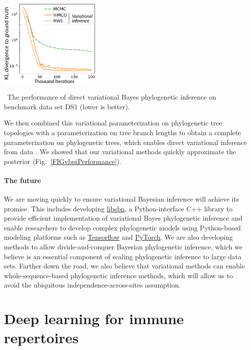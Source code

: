 \documentclass[nobib]{tufte-handout}
\begin{document}
\begin{marginfigure}[0.7in]%
  \includegraphics[width=1.95in]{vbpi-performance}
  \caption{\
    The performance of direct variational Bayes phylogenetic inference on benchmark data set DS1 (lower is better).
    }
  \label{FIGvbpiPerformance}
\end{marginfigure}%

We then combined this variational parameterization on phylogenetic tree topologies with a parameterization on tree branch lengths to obtain a complete parameterization on phylogenetic trees, which enables direct variational inference from data \cite{Zhang2018-lw}.
We showed that our variational methods quickly approximate the posterior (Fig.~\ref{FIGvbpiPerformance}).

\paragraph{The future}
We are moving quickly to ensure variational Bayesian inference will achieve its promise.
This includes developing \href{https://github.com/matsengrp/libsbn/}{libsbn}, a Python-interface C++ library to provide efficient implementation of variational Bayes phylogenetic inference and enable researchers to develop complex phylogenetic models using Python-based modeling platforms such as \href{https://www.tensorflow.org/}{Tensorflow} and \href{https://pytorch.org/}{PyTorch}.
We are also developing methods to allow divide-and-conquer Bayesian phylogenetic inference, which we believe is an essential component of scaling phylogenetic inference to large data sets.
Farther down the road, we also believe that variational methods can enable whole-sequence-based phylogenetic inference methods, which will allow us to avoid the ubiquitous independence-across-sites assumption.


\vspace{0.3cm}
\section{Deep learning for immune repertoires}
\vspace{-0.3cm}
\end{document}
